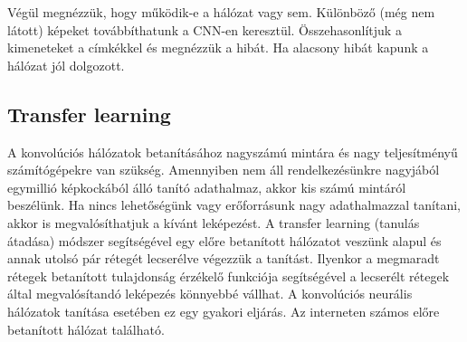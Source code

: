 Végül megnézzük, hogy működik-e a hálózat vagy sem. Különböző (még nem látott) képeket továbbíthatunk a CNN-en keresztül. Összehasonlítjuk a kimeneteket a címkékkel és megnézzük a hibát. Ha alacsony hibát kapunk a hálózat jól dolgozott.

\subsection{Transfer learning}

A konvolúciós hálózatok betanításához nagyszámú mintára és nagy teljesítményű számítógépekre van szükség. Amennyiben nem áll rendelkezésünkre nagyjából egymillió képkockából álló tanító adathalmaz, akkor kis számú mintáról beszélünk. Ha nincs lehetőségünk vagy erőforrásunk nagy adathalmazzal tanítani, akkor is megvalósíthatjuk a kívánt leképezést. A transfer learning (tanulás átadása) módszer segítségével egy előre betanított hálózatot veszünk alapul és annak utolsó pár rétegét lecserélve végezzük a tanítást. Ilyenkor a megmaradt rétegek betanított tulajdonság érzékelő funkciója segítségével a lecserélt rétegek által megvalósítandó leképezés könnyebbé vállhat. A konvolúciós neurális hálózatok tanítása esetében ez egy gyakori eljárás. Az interneten számos előre betanított hálózat található.
